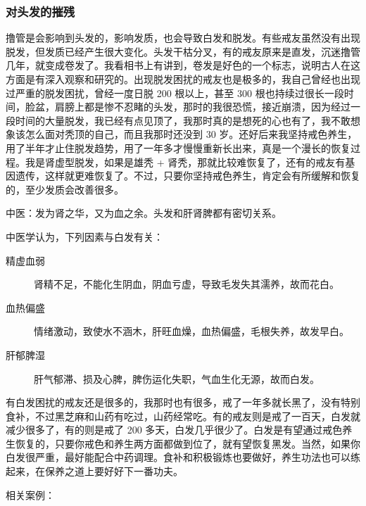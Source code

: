 \documentclass[fontset=founder]{ctexart}
\begin{document}
\subsubsection{对头发的摧残}

撸管是会影响到头发的，影响发质，也会导致白发和脱发。有些戒友虽然没有出现脱发，但发质已经产生很大变化。头发干枯分叉，有的戒友原来是直发，沉迷撸管几年，就变成卷发了。我看相书上有讲到，卷发是好色的一个标志，说明古人在这方面是有深入观察和研究的。出现脱发困扰的戒友也是极多的，我自己曾经也出现过严重的脱发困扰，曾经一度日脱 200 根以上，甚至 300 根也持续过很长一段时间，脸盆，肩膀上都是惨不忍睹的头发，那时的我很恐慌，接近崩溃，因为经过一段时间的大量脱发，我已经有点见顶了，我那时真的是想死的心也有了，我不敢想象该怎么面对秃顶的自己，而且我那时还没到 30 岁。还好后来我坚持戒色养生，用了半年才止住脱发趋势，用了一年多才慢慢重新长出来，真是一个漫长的恢复过程。我是肾虚型脱发，如果是雄秃 + 肾秃，那就比较难恢复了，还有的戒友有基因遗传，这样就更难恢复了。不过，只要你坚持戒色养生，肯定会有所缓解和恢复的，至少发质会改善很多。

中医：发为肾之华，又为血之余。头发和肝肾脾都有密切关系。

中医学认为，下列因素与白发有关：

\begin{description}
    \item[精虚血弱] 肾精不足，不能化生阴血，阴血亏虚，导致毛发失其濡养，故而花白。
    \item[血热偏盛] 情绪激动，致使水不涵木，肝旺血燥，血热偏盛，毛根失养，故发早白。
    \item[肝郁脾湿] 肝气郁滞、损及心脾，脾伤运化失职，气血生化无源，故而白发。
\end{description}

有白发困扰的戒友还是很多的，我那时也有很多，戒了一年多就长黑了，没有特别食补，不过黑芝麻和山药有吃过，山药经常吃。有的戒友则是戒了一百天，白发就减少很多了，有的则是戒了 200 多天，白发几乎很少了。白发是有望通过戒色养生恢复的，只要你戒色和养生两方面都做到位了，就有望恢复黑发。当然，如果你白发很严重，最好能配合中药调理。食补和积极锻炼也要做好，养生功法也可以练起来，在保养之道上要好好下一番功夫。

相关案例：
\end{document}
